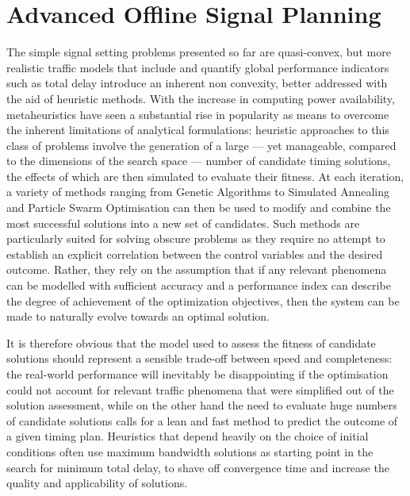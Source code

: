 \section{Advanced Offline Signal Planning}

The simple signal setting problems presented so far are quasi-convex, but more realistic traffic models that include and quantify global performance indicators such as total delay introduce an inherent non convexity, better addressed with the aid of heuristic methods.
With the increase in computing power availability, metaheuristics have seen a substantial rise in popularity as means to overcome the inherent limitations of analytical formulations: heuristic approaches to this class of problems involve the generation of a large — yet manageable, compared to the dimensions of the search space — number of candidate timing solutions, the effects of which are then simulated to evaluate their fitness. At each iteration, a variety of methods ranging from Genetic Algorithms to Simulated Annealing and Particle Swarm Optimisation can then be used to modify and combine the most successful solutions into a new set of candidates.
Such methods are particularly suited for solving obscure problems as they require no attempt to establish an explicit correlation between the control variables and the desired outcome. Rather, they rely on the assumption that if any relevant phenomena can be modelled with sufficient accuracy and a performance index can describe the degree of achievement of the optimization objectives, then the system can be made to naturally evolve towards an optimal solution.


It is therefore obvious that the model used to assess the fitness of candidate solutions should represent a sensible trade-off between speed and completeness: the real-world performance will inevitably be disappointing if the optimisation could not account for relevant traffic phenomena that were simplified out of the solution assessment, while on the other hand the need to evaluate huge numbers of candidate solutions calls for a lean and fast method to predict the outcome of a given timing plan. Heuristics that depend heavily on the choice of initial conditions often use maximum bandwidth solutions as starting point in the search for minimum total delay, to shave off convergence time and increase the quality and applicability of solutions.

